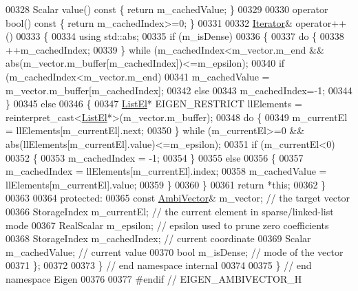 \begin{DoxyCode}
00328     Scalar value()\textcolor{keyword}{ const }\{ \textcolor{keywordflow}{return} m\_cachedValue; \}
00329 
00330     \textcolor{keyword}{operator} bool()\textcolor{keyword}{ const }\{ \textcolor{keywordflow}{return} m\_cachedIndex>=0; \}
00331 
00332     \hyperlink{class_eigen_1_1internal_1_1_ambi_vector_1_1_iterator}{Iterator}& operator++()
00333     \{
00334       \textcolor{keyword}{using} std::abs;
00335       \textcolor{keywordflow}{if} (m\_isDense)
00336       \{
00337         \textcolor{keywordflow}{do} \{
00338           ++m\_cachedIndex;
00339         \} \textcolor{keywordflow}{while} (m\_cachedIndex<m\_vector.m\_end && abs(m\_vector.m\_buffer[m\_cachedIndex])<=m\_epsilon);
00340         \textcolor{keywordflow}{if} (m\_cachedIndex<m\_vector.m\_end)
00341           m\_cachedValue = m\_vector.m\_buffer[m\_cachedIndex];
00342         \textcolor{keywordflow}{else}
00343           m\_cachedIndex=-1;
00344       \}
00345       \textcolor{keywordflow}{else}
00346       \{
00347         \hyperlink{struct_eigen_1_1internal_1_1_ambi_vector_1_1_list_el}{ListEl}* EIGEN\_RESTRICT llElements = \textcolor{keyword}{reinterpret\_cast<}\hyperlink{struct_eigen_1_1internal_1_1_ambi_vector_1_1_list_el}{ListEl}*\textcolor{keyword}{>}(m\_vector.m\_buffer);
00348         \textcolor{keywordflow}{do} \{
00349           m\_currentEl = llElements[m\_currentEl].next;
00350         \} \textcolor{keywordflow}{while} (m\_currentEl>=0 && abs(llElements[m\_currentEl].value)<=m\_epsilon);
00351         \textcolor{keywordflow}{if} (m\_currentEl<0)
00352         \{
00353           m\_cachedIndex = -1;
00354         \}
00355         \textcolor{keywordflow}{else}
00356         \{
00357           m\_cachedIndex = llElements[m\_currentEl].index;
00358           m\_cachedValue = llElements[m\_currentEl].value;
00359         \}
00360       \}
00361       \textcolor{keywordflow}{return} *\textcolor{keyword}{this};
00362     \}
00363 
00364   \textcolor{keyword}{protected}:
00365     \textcolor{keyword}{const} \hyperlink{class_eigen_1_1internal_1_1_ambi_vector}{AmbiVector}& m\_vector; \textcolor{comment}{// the target vector}
00366     StorageIndex m\_currentEl;   \textcolor{comment}{// the current element in sparse/linked-list mode}
00367     RealScalar m\_epsilon;       \textcolor{comment}{// epsilon used to prune zero coefficients}
00368     StorageIndex m\_cachedIndex; \textcolor{comment}{// current coordinate}
00369     Scalar m\_cachedValue;       \textcolor{comment}{// current value}
00370     \textcolor{keywordtype}{bool} m\_isDense;             \textcolor{comment}{// mode of the vector}
00371 \};
00372 
00373 \} \textcolor{comment}{// end namespace internal}
00374 
00375 \} \textcolor{comment}{// end namespace Eigen}
00376 
00377 \textcolor{preprocessor}{#endif // EIGEN\_AMBIVECTOR\_H}
\end{DoxyCode}
